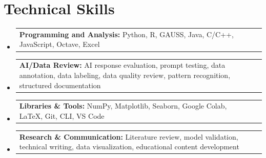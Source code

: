 \documentclass[letterpaper,11pt]{article}
\makeatletter
\newcommand{\resumeProjectHeading}[2]{
    \item
    \begin{tabular*}{0.97\textwidth}{l@{\extracolsep{\fill}}r}
      \small#1 & #2 \\
    \end{tabular*}\vspace{-6pt}
}
\newcommand{\resumeSubHeadingListStart}{\begin{itemize}[leftmargin=0.15in, label={}]}
\newcommand{\resumeSubHeadingListEnd}{\end{itemize}}
\makeatother
\begin{document}
\section{Technical Skills}
\resumeSubHeadingListStart
    \resumeProjectHeading
      {\textbf{Programming and Analysis:} Python, R, GAUSS, Java, C/C++, JavaScript, Octave, Excel}{}

    \resumeProjectHeading
      {\textbf{AI/Data Review:} AI response evaluation, prompt testing, data annotation, data labeling, data quality review, pattern recognition, structured documentation}{}

    \resumeProjectHeading
      {\textbf{Libraries \& Tools:} NumPy, Matplotlib, Seaborn, Google Colab, \LaTeX, Git, CLI, VS Code}{}

    \resumeProjectHeading
      {\textbf{Research \& Communication:} Literature review, model validation, technical writing, data visualization, educational content development}{}
\resumeSubHeadingListEnd


\end{document}
